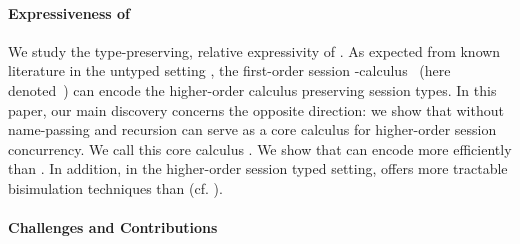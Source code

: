\documentclass[preprint,11pt]{elsarticle}
\begin{document}
\paragraph{Expressiveness of \HOp}
We study the type-preserving, 
relative expressivity of \HOp. %
As expected from 
known literature in the untyped setting \cite{SangiorgiD:expmpa}, 
the first-order session \sessp-calculus~\cite{honda.vasconcelos.kubo:language-primitives} {(here denoted~\sessp)} 
can encode  the higher-order calculus
\HOp preserving session types. 
In this paper, 
our {main discovery} 
concerns the opposite direction: we show 
that 
\HOp 
without
name-passing and recursion
can serve as a 
core calculus    
for higher-order session concurrency.  
We call this core calculus \HO. 
We show that \HO can encode \HOp more efficiently 
than \sessp. In addition, in the higher-order session typed setting, 
\HO offers more tractable bisimulation techniques 
than \sessp (cf. ).



\paragraph{Challenges and Contributions}
\end{document}
